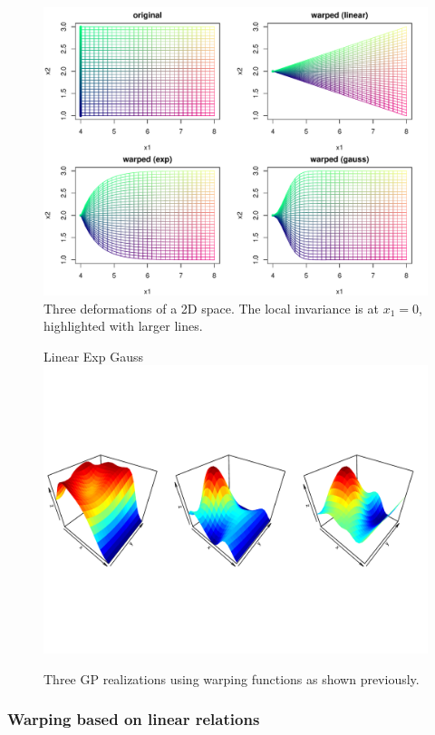 \begin{figure}[!ht]
\centering
 \includegraphics[width=.8\textwidth]{def2Dsimple.pdf}
 \caption{Three deformations of a 2D space. The local invariance is at $x_1=0$, highlighted with larger lines.}\label{fig:3defsimple}
\end{figure}

\begin{figure}[!ht]
\centering
Linear \hspace{4cm} Exp \hspace{4cm} Gauss
 \includegraphics[trim=2mm 45mm 2mm 45mm,clip, width=\textwidth]{simu2Dsimple.pdf}
 \caption{Three GP realizations using warping functions as shown previously.}\label{fig:simu2Dsimple}
\end{figure}

\subsubsection{Warping based on linear relations}

